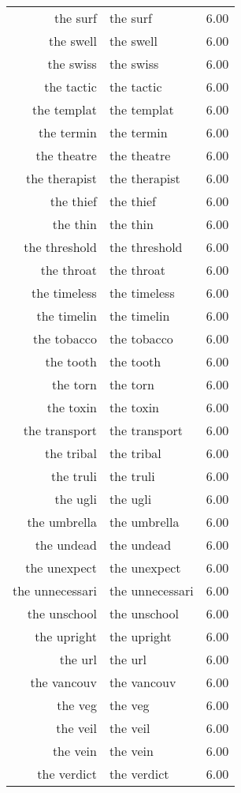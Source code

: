 \begin{table}[ht]
\begin{tabular}{rlr}
  the surf & the surf & 6.00 \\ 
  the swell & the swell & 6.00 \\ 
  the swiss & the swiss & 6.00 \\ 
  the tactic & the tactic & 6.00 \\ 
  the templat & the templat & 6.00 \\ 
  the termin & the termin & 6.00 \\ 
  the theatre & the theatre & 6.00 \\ 
  the therapist & the therapist & 6.00 \\ 
  the thief & the thief & 6.00 \\ 
  the thin & the thin & 6.00 \\ 
  the threshold & the threshold & 6.00 \\ 
  the throat & the throat & 6.00 \\ 
  the timeless & the timeless & 6.00 \\ 
  the timelin & the timelin & 6.00 \\ 
  the tobacco & the tobacco & 6.00 \\ 
  the tooth & the tooth & 6.00 \\ 
  the torn & the torn & 6.00 \\ 
  the toxin & the toxin & 6.00 \\ 
  the transport & the transport & 6.00 \\ 
  the tribal & the tribal & 6.00 \\ 
  the truli & the truli & 6.00 \\ 
  the ugli & the ugli & 6.00 \\ 
  the umbrella & the umbrella & 6.00 \\ 
  the undead & the undead & 6.00 \\ 
  the unexpect & the unexpect & 6.00 \\ 
  the unnecessari & the unnecessari & 6.00 \\ 
  the unschool & the unschool & 6.00 \\ 
  the upright & the upright & 6.00 \\ 
  the url & the url & 6.00 \\ 
  the vancouv & the vancouv & 6.00 \\ 
  the veg & the veg & 6.00 \\ 
  the veil & the veil & 6.00 \\ 
  the vein & the vein & 6.00 \\ 
  the verdict & the verdict & 6.00 \\ 

\end{tabular}
\end{table}
